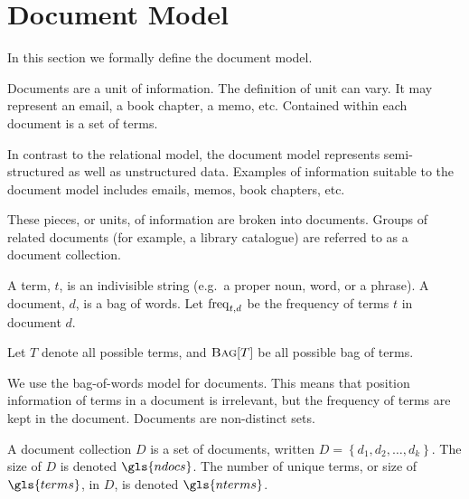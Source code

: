 \section{Document Model}
	In this section we formally define the document model.
	
	Documents are a unit of information.  The definition of unit can vary.  It may represent an email, a book chapter, a memo, etc.  Contained within each document is a set of terms.
	
	In contrast to the relational model, the document model represents semi-structured as well as unstructured data.  Examples of information suitable to the document model includes emails, memos, book chapters, etc.
	
	These pieces, or units, of information are broken into documents.  Groups of related documents (for example, a library catalogue) are referred to as a document collection.

	\begin{defn}
	\label{def:document}
		A term, $t$, is an indivisible string (e.g.~a proper noun, word, or a phrase).  A document, $d$, is a bag of words.  Let $\operatorname{freq}_{t, d}$ be the frequency of terms $t$ in document $d$.
		
		Let $T$ denote all possible terms, and $\textsc{Bag}\lbrack T\rbrack$ be all possible bag of terms.
	\end{defn}
	
	\begin{remark}
		We use the bag-of-words model for documents.  This means that position information of terms in a document is irrelevant, but the frequency of terms are kept in the document.  Documents are non-distinct sets.
	\end{remark}
	
	\begin{defn}
	\label{def:document-collection}
		A document collection $D$ is a set of documents, written $D = \left\{d_1, d_2, \dotsc, d_k\right\}$.  The size of $D$ is denoted $\gls{ndocs}$.  The number of unique terms, or size of $\gls{terms}$, in $D$, is denoted $\gls{nterms}$.
	\end{defn}
	
